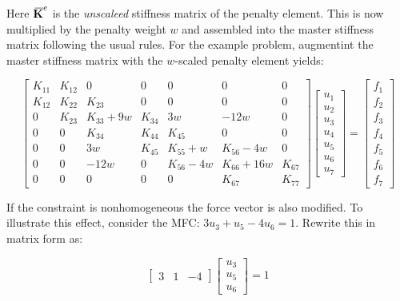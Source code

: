 \documentclass[10pt,b5paper,titlepage]{book}
\newcommand{\m}{\mathbf}
\newcommand{\closure}[2][3]{%
{}\mkern#1mu\overline{\mkern-#1mu#2}}
\begin{document}
Here $ \m{\closure{K}}^e $ is the \textit{unscaleed} stiffness matrix of
the penalty element. This is now multiplied by the penalty weight $ w $ and
assembled into the master stiffness matrix following the usual rules. For the
example problem, augmentint the master stiffness matrix with the $ w $-scaled
penalty element yields:

\begin{equation}
    \begin{bmatrix}
        K_{11} & K_{12} & 0 & 0 & 0 & 0 & 0 \\
        K_{12} & K_{22} & K_{23} & 0 & 0 & 0 & 0 \\
        0 & K_{23} & K_{33} + 9 w & K_{34} & 3w & -12w & 0 \\
        0 & 0 & K_{34} & K_{44} & K_{45} & 0 & 0 \\
        0 & 0 & 3w & K_{45} & K_{55} + w & K_{56} - 4w & 0 \\
        0 & 0 & -12w & 0 & K_{56} - 4w & K_{66} + 16w & K_{67} \\
        0 & 0 & 0 & 0 & 0 & K_{67} & K_{77}
    \end{bmatrix}
    \begin{bmatrix}
        u_1 \\
        u_2 \\
        u_3 \\
        u_4 \\
        u_5 \\
        u_6 \\
        u_7
    \end{bmatrix}
    = \begin{bmatrix}
        f_1 \\
        f_2 \\
        f_3 \\
        f_4 \\
        f_5 \\
        f_6 \\
        f_7
    \end{bmatrix}
\end{equation}

If the constraint is nonhomogeneous the force vector is also modified. To illustrate this
effect, consider the MFC: $ 3 u_3 + u_5 - 4 u_6 = 1 $. Rewrite this in matrix form as:

\begin{equation}
    \begin{bmatrix}
        3 & 1 & -4
    \end{bmatrix}
    \begin{bmatrix}
        u_3 \\
        u_5 \\
        u_6
    \end{bmatrix}
    = 1
\end{equation}
\end{document}
